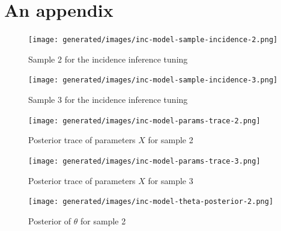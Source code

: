 \documentclass[
  digital, %
  oneside, %
  lof,     %
  lot,     %
]{fithesis4}
\begin{document}
\cite{blei2018}


\cite{davidson-pilon2015}


\printbibliography[heading=bibintoc]

\appendix

\chapter{An appendix}





\begin{figure}[H]
  \begin{center}
    \texttt{[image: generated/images/inc-model-sample-incidence-2.png]}
  \end{center}
  \caption{Sample 2 for the incidence inference tuning}
  \label{fig:dev-incidence-2}
\end{figure}

\begin{figure}[H]
  \begin{center}
    \texttt{[image: generated/images/inc-model-sample-incidence-3.png]}
  \end{center}
  \caption{Sample 3 for the incidence inference tuning}
  \label{fig:dev-incidence-3}
\end{figure}



\begin{figure}[H]
  \begin{center}
    \texttt{[image: generated/images/inc-model-params-trace-2.png]}
  \end{center}
  \caption{Posterior trace of parameters $X$ for sample 2}
  \label{fig:params-trace-2}
\end{figure}



\begin{figure}[H]
  \begin{center}
    \texttt{[image: generated/images/inc-model-params-trace-3.png]}
  \end{center}
  \caption{Posterior trace of parameters $X$ for sample 3}
  \label{fig:params-trace-3}
\end{figure}




\begin{figure}[H]
  \begin{center}
    \texttt{[image: generated/images/inc-model-theta-posterior-2.png]}
  \end{center}
  \caption{Posterior of $\theta$ for sample 2}
  \label{fig:theta-posterior-2}
\end{figure}
\end{document}
